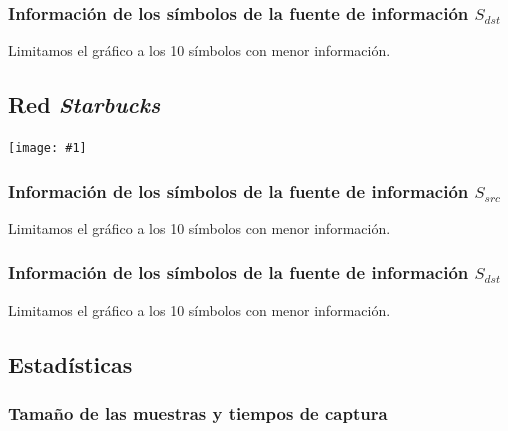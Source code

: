 \documentclass[a4paper, 10pt, twoside]{article}
\newcommand{\grafo}[1]{
  \texttt{[image: \#1]}
}
\begin{document}

\vspace{2cm}


\subsubsection{Información de los símbolos de la fuente de información $S_{dst}$}

Limitamos el gráfico a los 10 símbolos con menor información.


\vspace{2cm}




\subsection{Red \emph{Starbucks}}

\grafo{starbucks}


\subsubsection{Información de los símbolos de la fuente de información $S_{src}$}

Limitamos el gráfico a los 10 símbolos con menor información.


\vspace{2cm}


\subsubsection{Información de los símbolos de la fuente de información $S_{dst}$}

Limitamos el gráfico a los 10 símbolos con menor información.


\vspace{2cm}







\subsection{Estadísticas}


\subsubsection{Tamaño de las muestras y tiempos de captura}
\end{document}
